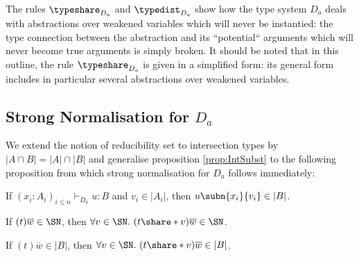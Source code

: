 \medskip \noindent
The rules $\typeshare_{D_a}$ and $\typedist_{D_a}$ show how the type system $D_a$ deals with abstractions over weakened variables which will never be instantied: the type connection between the abstraction and its ``potential`` arguments which will never become true arguments is simply broken. It should be noted that in this outline, the rule $\typeshare_{D_a}$ is given in a simplified form: its general form includes in particular several abstractions over weakened variables.

\subsection{Strong Normalisation for $D_a$}

We extend the notion of reducibility set to intersection types by $|A\cap B|=|A|\cap|B|$ and generalise proposition \ref{prop:IntSubst} to the following proposition from which strong normalisation for $D_a$ follows immediately:

                                                                
\begin{ALproposition}\label{prop:IntSubstIntersection}
If $(x_i:A_i)_{i\leq n}\vdash_{D_a} u:B$ and $v_i \in |A_i|$, then $u\subn{x_i}{v_i} \in |B|$.
\end{ALproposition}


\begin{ALlemma}
\label{lem:weakening SN}
If $(t)\overline w\in\SN$, then $\forall v\in\SN.~(t\share*{}v)\overline w\in\SN$.
\end{ALlemma}

\begin{ALlemma}
\label{lem:weakening RED}
If $(t)\overline w\in|B|$, then $\forall v\in\SN.~(t\share*{}v)\overline w\in|B|$.
\end{ALlemma}
%


